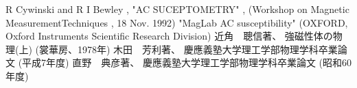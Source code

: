 \begin{thebibliography}{5}
 R Cywinski and R I Bewley , "AC SUCEPTOMETRY" , 
		(Workshop on Magnetic MeasurementTechniques , 18 Nov. 1992)
 "MagLab  AC susceptibility" 
		(OXFORD, Oxford Instruments Scientific Research Division)
 近角　聰信著、
					強磁性体の物理(上)
					(裳華房、1978年)
 木田　芳利著、
				慶應義塾大学理工学部物理学科卒業論文
				(平成7年度)
 直野　典彦著、
				慶應義塾大学理工学部物理学科卒業論文
				(昭和60年度)
				
\end{thebibliography}
